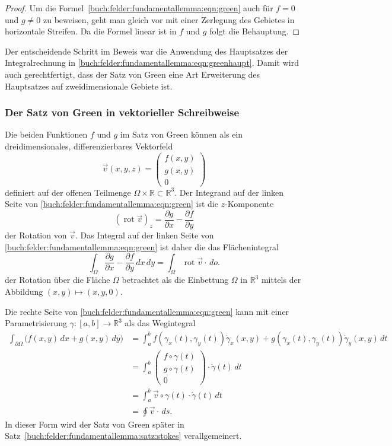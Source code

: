 \begin{proof}
Um die Formel~\eqref{buch:felder:fundamentallemma:eqn:green} auch
für $f=0$ und $g\ne 0$ zu beweisen, geht man gleich vor mit 
einer Zerlegung des Gebietes in horizontale Streifen.
Da die Formel linear ist in $f$ und $g$ folgt die Behauptung.
\end{proof}

Der entscheidende Schritt im Beweis war die Anwendung des Hauptsatzes
der Integralrechnung in
\eqref{buch:felder:fundamentallemma:eqn:greenhaupt}.
Damit wird auch gerechtfertigt, dass der Satz von Green eine Art
Erweiterung des Hauptsatzes auf zweidimensionale Gebiete ist.

%
%
\subsubsection{Der Satz von Green in vektorieller Schreibweise}
Die beiden Funktionen $f$ und $g$ im Satz von Green können als
ein dreidimensionales, differenzierbares Vektorfeld
\[
\vec{v}(x,y,z)
=
\begin{pmatrix}
f(x,y)\\
g(x,y)\\
0
\end{pmatrix}
\]
definiert auf der offenen Teilmenge $\Omega\times\mathbb{R}\subset\mathbb{R}^3$.
Der Integrand auf der linken Seite von
\eqref{buch:felder:fundamentallemma:eqn:green} ist die $z$-Komponente
\[
(\operatorname{rot}\vec{v})_z
=
\frac{\partial g}{\partial x}-\frac{\partial f}{\partial y}
\]
der Rotation von $\vec{v}$.
Das Integral auf der linken Seite von
\eqref{buch:felder:fundamentallemma:eqn:green}
ist daher die das Flächenintegral
\[
\int_\Omega
\frac{\partial g}{\partial x}-\frac{\partial f}{\partial y}\,dx\,dy
=
\int_\Omega
\operatorname{rot} \vec{v}
\cdot \,do.
\]
der Rotation über die Fläche $\Omega$ betrachtet als die Einbettung
$\Omega$ in $\mathbb{R}^3$ mittels der Abbildung $(x,y)\mapsto (x,y,0)$.

Die rechte Seite von
\eqref{buch:felder:fundamentallemma:eqn:green} kann mit einer
Parametrisierung $\gamma\colon [a,b]\to \mathbb{R}^3$ 
als das Wegintegral
\begin{align*}
\int_{\partial\Omega} \bigl(f(x,y)\,dx + g(x,y)\,dy\bigr)
&=
\int_a^b
f(\gamma_x(t),\gamma_y(t))\dot{\gamma}_x(x,y)
+
g(\gamma_x(t),\gamma_y(t))\dot{\gamma}_y(x,y)
\,dt
\\
&=
\int_a^b
\begin{pmatrix}
f\circ\gamma(t)\\
g\circ\gamma(t)\\
0
\end{pmatrix}
\cdot
\dot{\gamma}(t)
\,dt
\\
&=
\int_a^b
\vec{v}\circ\gamma(t)
\cdot
\dot{\gamma}(t)
\,dt
\\
&=
\oint \vec{v}\cdot\,ds.
\end{align*}
In dieser Form wird der Satz von Green später in
Satz~\ref{buch:felder:fundamentallemma:satz:stokes} verallgemeinert.

